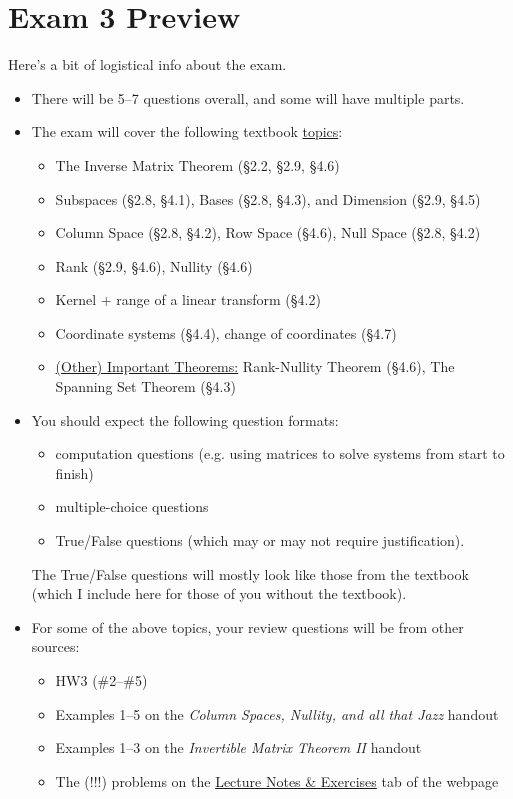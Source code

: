 \documentclass[12pt]{article}
\begin{document}
	\section*{\centering Exam 3 Preview}
	
	\noindent Here's a bit of logistical info about the exam.
	\begin{itemize}[topsep=0.125in,itemsep=0.625mm]
		\item There will be 5--7 questions overall, and some will have multiple parts.
		\item The exam will cover the following textbook \ul{topics}: 
		\begin{itemize}[topsep=0mm]	
			\item The Inverse Matrix Theorem (\S 2.2, \S 2.9, \S 4.6)
			\item Subspaces (\S 2.8, \S 4.1), Bases (\S 2.8, \S 4.3), and Dimension (\S 2.9, \S 4.5)
			\item Column Space (\S 2.8, \S 4.2), Row Space (\S 4.6), Null Space (\S 2.8, \S 4.2)
			\item Rank (\S 2.9, \S 4.6), Nullity (\S 4.6)
			\item Kernel + range of a linear transform (\S 4.2)
			\item Coordinate systems (\S 4.4), change of coordinates (\S 4.7)
			\item \ul{(Other) Important Theorems:} Rank-Nullity Theorem (\S 4.6), The Spanning Set Theorem (\S 4.3)
		\end{itemize}
		\item You should expect the following question formats:
		\begin{itemize}[topsep=0mm]
			\item computation questions (e.g. using matrices to solve systems from start to finish)
			\item multiple-choice questions
			\item True/False questions (which may or may not require justification).
		\end{itemize}
		The True/False questions will mostly look like those from the textbook (which I include here for those of you without the textbook).
		\item For some of the above topics, your review questions will be from other sources:
		\begin{itemize}[topsep=0mm]
			\item HW3 (\#2--\#5)
			\item Examples 1--5 on the \textit{Column Spaces, Nullity, and all that Jazz} handout
			\item Examples 1--3 on the \textit{Invertible Matrix Theorem II} handout
			\item The (!!!) problems on the \ul{Lecture Notes \& Exercises} tab of the webpage
		\end{itemize}
	\end{itemize}
	
\end{document}

